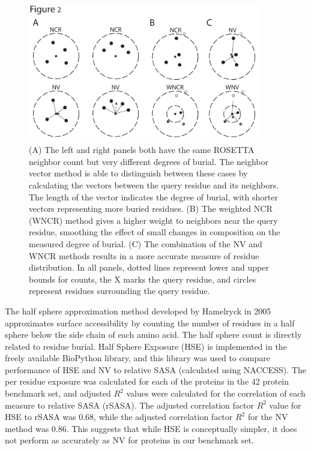 \begin{figure}
\centering
\includegraphics[width=4in]{figures/nv_kbp/nv_schematic}
\caption{
(A) The left and right panels both have the same ROSETTA neighbor count \citep{Dantas:2003vt} but very different degrees of burial.
The neighbor vector method is able to distinguish between these cases by calculating the vectors between the query residue and its neighbors.
The length of the vector indicates the degree of burial, with shorter vectors representing more buried residues. 
(B) The weighted NCR (WNCR) method gives a higher weight to neighbors near the query residue, smoothing the effect of small changes in composition on the measured degree of burial. 
(C) The combination of the NV and WNCR methods results in a more accurate measure of residue distribution. 
In all panels, dotted lines represent lower and upper bounds for counts, the X marks the query residue, and circles represent residues surrounding the query residue.
}
\label{fig:nv_schematic}
\end{figure}

The half sphere approximation method developed by Hamelryck in 2005 \citep{Hamelryck:2005kt} approximates surface accessibility by counting the number of residues in a half sphere below the side chain of each amino acid.
The half sphere count is directly related to residue burial.
Half Sphere Exposure (HSE) is implemented in the freely available BioPython library, and this library was used to compare performance of HSE and NV to relative SASA (calculated using NACCESS).
The per residue exposure was calculated for each of the proteins in the 42 protein benchmark set, and adjusted $R^{2}$ values were calculated for the correlation of each measure to relative SASA (rSASA).
The adjusted correlation factor $R^{2}$ value for HSE to rSASA was 0.68, while the adjusted correlation factor $R^{2}$ for the NV method was 0.86.
This suggests that while HSE is conceptually simpler, it does not perform as accurately as NV for proteins in our benchmark set.


